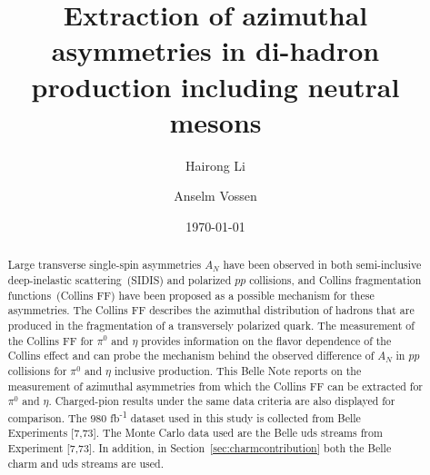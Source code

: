 \documentclass[english,notitlepage,12pt,a4paper]{article}
\begin{document}
\thispagestyle{fancy}

\title{Extraction of azimuthal asymmetries in di-hadron production including neutral mesons}
\author[1]{Hairong Li}
\author[1]{Anselm Vossen}

\date{\today}
\maketitle
\thispagestyle{fancy}
\begin{abstract}
\begin{small}%

Large transverse single-spin asymmetries $A_N$ have been observed in both semi-inclusive deep-inelastic scattering~(SIDIS) and polarized $pp$ collisions, and Collins fragmentation functions~(Collins FF)  have been proposed as a possible mechanism for these asymmetries. The Collins FF describes the azimuthal distribution of hadrons that are produced in the fragmentation of a transversely polarized quark. The measurement of the Collins FF for $\pi^{0}$ and $\eta$ provides information on the flavor dependence of the Collins effect and can probe the mechanism behind the observed difference of $A_N$ in $pp$ collisions for $\pi^{0}$ and $\eta$ inclusive production. This Belle Note reports on the measurement of azimuthal asymmetries from which the Collins FF can be extracted for $\pi^{0}$ and $\eta$. Charged-pion results under the same data criteria are also displayed for comparison. The $980$ fb\textsuperscript{-1} dataset used in this study is collected from Belle Experiments [7,73]. The Monte Carlo data used are the Belle \textsc{}uds\textsc{} streams from Experiment [7,73]. In addition, in Section~\ref{sec:charmcontribution} both the Belle \textsc{}charm\textsc{} and \textsc{}uds\textsc{} streams are used. 

\end{small}
\end{abstract}
\end{document}

